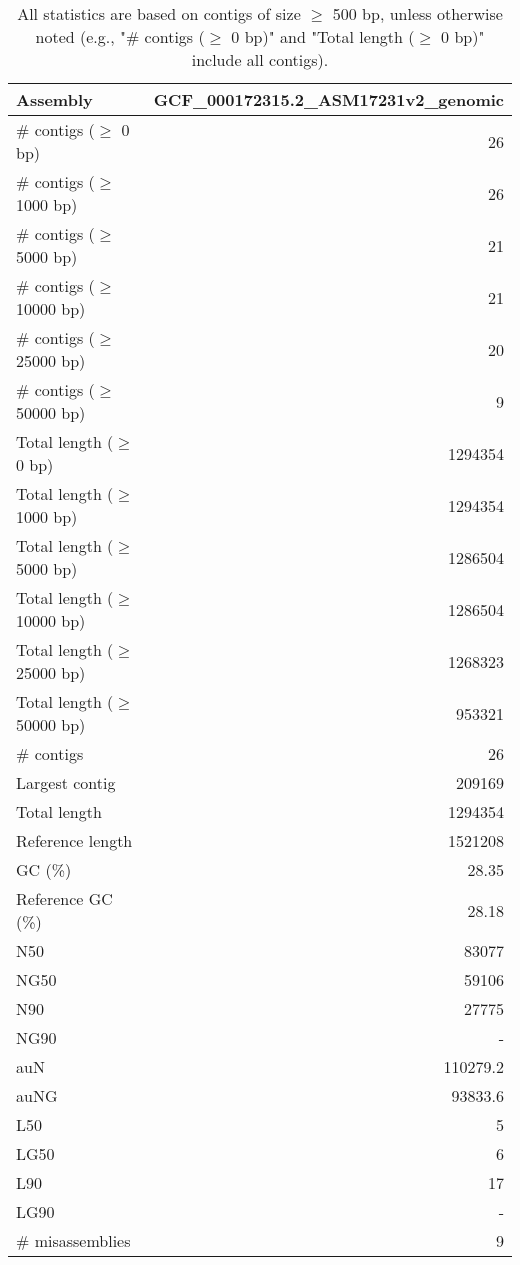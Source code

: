 \documentclass[12pt,a4paper]{article}
\begin{document}
\begin{table}[ht]
\begin{center}
\caption{All statistics are based on contigs of size $\geq$ 500 bp, unless otherwise noted (e.g., "\# contigs ($\geq$ 0 bp)" and "Total length ($\geq$ 0 bp)" include all contigs).}
\begin{tabular}{|l*{1}{|r}|}
\hline
Assembly & GCF\_000172315.2\_ASM17231v2\_genomic \\ \hline
\# contigs ($\geq$ 0 bp) & 26 \\ \hline
\# contigs ($\geq$ 1000 bp) & 26 \\ \hline
\# contigs ($\geq$ 5000 bp) & 21 \\ \hline
\# contigs ($\geq$ 10000 bp) & 21 \\ \hline
\# contigs ($\geq$ 25000 bp) & 20 \\ \hline
\# contigs ($\geq$ 50000 bp) & 9 \\ \hline
Total length ($\geq$ 0 bp) & 1294354 \\ \hline
Total length ($\geq$ 1000 bp) & 1294354 \\ \hline
Total length ($\geq$ 5000 bp) & 1286504 \\ \hline
Total length ($\geq$ 10000 bp) & 1286504 \\ \hline
Total length ($\geq$ 25000 bp) & 1268323 \\ \hline
Total length ($\geq$ 50000 bp) & 953321 \\ \hline
\# contigs & 26 \\ \hline
Largest contig & 209169 \\ \hline
Total length & 1294354 \\ \hline
Reference length & 1521208 \\ \hline
GC (\%) & 28.35 \\ \hline
Reference GC (\%) & 28.18 \\ \hline
N50 & 83077 \\ \hline
NG50 & 59106 \\ \hline
N90 & 27775 \\ \hline
NG90 & - \\ \hline
auN & 110279.2 \\ \hline
auNG & 93833.6 \\ \hline
L50 & 5 \\ \hline
LG50 & 6 \\ \hline
L90 & 17 \\ \hline
LG90 & - \\ \hline
\# misassemblies & 9 \\ \hline

\end{tabular}
\end{center}
\end{table}
\end{document}
